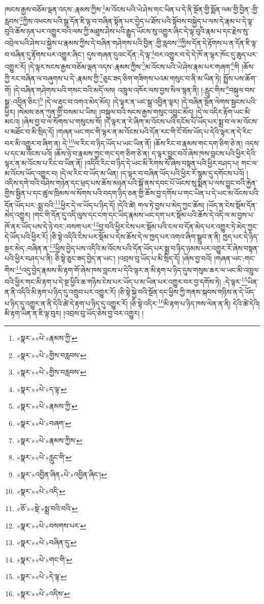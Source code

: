 །སངས་རྒྱས་བཅོམ་ལྡན་འདས་:རྣམས་ཀྱིས་\footnote{«སྣར་»«པེ་»རྣམས་ཀྱི་}མ་འོངས་པའི་ཡེ་ཤེས་གང་ཡིན་པ་དེ་ནི་སྔོན་གྱི་སྨོན་ལམ་གྱི་བྱིན་:གྱི་རླབས་\footnote{«སྣར་»«པེ་»གྱིས་བརླབས་}ཀྱིས་འཕངས་པའི་སྒྲ་དོན་ཇི་ལྟ་བ་བཞིན་སྟོན་པར་བྱེད་པ་ཐོས་པའི་སྟོབས་བསྐྱེད་པ་ལས་དེ་རྣམ་པ་དེ་ལྟ་བུའི་ཆོས་ཉན་པར་འགྱུར་བའི་ལས་ཀྱི་མཐུས་ཤེས་པའི་རྒྱུད་ཡོངས་སུ་འགྱུར་ཞིང་དེ་ལྟ་བུའི་རྣམ་པ་དང་རྗེས་སུ་འབྲེལ་པའི་ཤེས་པ་སྐྱེས་པ་རྣམས་ཀྱིས་དེ་བཞིན་གཤེགས་པའི་བྱིན་:གྱི་རླབས་\footnote{«སྣར་»«པེ་»གྱིས་བརླབས་}ཀྱིས་དོན་དེ་རྟོགས་པ་ན་དོན་ཇི་ལྟ་བ་བཞིན་དུ་རྟོགས་པར་འགྱུར་ཞིང་། དུས་གཞན་དུའང་དོན་:དེ་ལྟ་\footnote{«སྣར་»«པེ་»ད་ལྟ་}བར་འགྱུར་བ་དེ་དེ་ཁོ་ན་ལྟར་ཁོང་དུ་ཆུད་པར་འགྱུར་རོ། །དེ་ལྟར་སངས་རྒྱས་བཅོམ་ལྡན་འདས་:རྣམས་ཀྱིས་\footnote{«སྣར་»«པེ་»རྣམས་ཀྱི་}མ་འོངས་པའི་ཡེ་ཤེས་རྣམ་པར་གཞག་\footnote{«སྣར་»«པེ་»བཞག་}གི །ཆོས་ཀྱི་རང་བཞིན་ལ་བཞུགས་པ་དེ་:རྣམས་ཀྱི་\footnote{«སྣར་»«པེ་»རྣམས་ཀྱིས་}ཅུང་ཟད་ཅིག་གཟིགས་པའམ་གསུང་བ་ནི་མ་ཡིན་ཏེ། སྤྲོས་པས་ཆོག་གོ། །དེ་བཞིན་གཤེགས་པའི་གསང་བའི་མདོ་ལས། འཁྲུལ་འཁོར་ལས་བྱས་སིལ་སྙན་ནི། །:རླུང་གིས་\footnote{«སྣར་»«པེ་»རླུང་གི་}བསྐུལ་བས་སྒྲ་:འབྱིན་ཅིང་།\footnote{«སྣར་»འབྱིན་ཞིན«པེ་»འབྱིན་ཞིང་།} །དེ་ལ་རྡུང་བ་འགའ་མེད་མོད། །དེ་ལྟར་ན་ཡང་སྒྲ་འབྱིན་ལྟར། །དེ་བཞིན་སྔོན་ལེགས་སྦྱངས་པའི་ཕྱིར། །སེམས་ཅན་ཀུན་གྱི་བསམ་པ་ཡིས། །བསྐུལ་བའི་སངས་རྒྱས་གསུང་འབྱུང་མོད། །དེ་ལ་འདིར་རྟོག་ཡང་མི་མངའ། །ཞེས་བྱ་བ་ལ་སོགས་པ་གསུངས་སོ། །དེ་ལྟར་ན་རེ་ཞིག་མ་འོངས་པའི་དངོས་པོ་ཡོད་པར་སྨྲ་བ་ལ་མ་འོངས་པ་མཐོང་བ་མི་སྲིད་དོ། །གཞན་ཡང་གང་གི་ལྟར་ན་མ་འོངས་པའི་དོན་རང་གི་ངོ་བོས་ཡོད་པ་དེའི་ལྟར་ན་དེ་རིང་བར་མི་འགྱུར་བ་ཞིག་ན། དེ་\footnote{«སྣར་»«པེ་»འདི་}ལ་རིང་བ་ཉིད་ཡོད་པ་ཡང་ཡིན་ནོ། །ཆོས་རིང་བ་རྣམས་གང་དག་ཅིག་ཅེ་ན། འདས་པ་དང་མ་འོངས་པའོ། །ཆོས་ཉེ་བ་རྣམས་ཀྱང་གང་དག་ཅིག་ཅེ་ན། ད་ལྟར་བྱུང་བའོ་ཞེས་ཁས་བླངས་པའི་ཕྱིར་དེའི་ལྟར་ན་མ་འོངས་པ་རིང་བ་ཡིན་ནོ། །འདིའི་རིང་བ་ཉིད་དེ་ཡང་མི་རིགས་སོ་ཞེས་བསྟན་པའི་ཕྱིར་བཤད་པ། གང་ལ་མ་འོངས་ཡོད་འགྱུར་བ། །དེ་ལ་རིང་བ་ཡོད་མ་ཡིན། །ད་ལྟར་བ་བཞིན་ཡོད་པའི་ཕྱིར་རོ་སྙམ་དུ་དགོངས་པའོ། །འདིས་དགེ་བའི་བཤེས་གཉེན་དང་ཕྲད་པས་ཆོས་མཉན་པའི་སྒོ་ནས་དབང་པོ་ཡོངས་སུ་སྨིན་པ་ལས་བྱུང་བའི་རྐྱེན་གྱིས་སྦྱིན་པ་དང་ཚུལ་ཁྲིམས་ལ་སོགས་པའི་བདག་ཉིད་ཅན་གྱི་ཆོས་བྱ་དགོས་པ་གང་ཡིན་པ་དེ་ཡང་མ་འོངས་པའི་དོན་ཡོད་པར་:སྨྲ་བའི་\footnote{«ཅོ་»«སྡེ་»སྨྲ་བའི་བའི་}ཕྱིར་དེ་ལ་ཡོད་པ་ཉིད་དོ། །དེའི་ཚེ། གལ་ཏེ་བྱས་པ་མེད་ཀྱང་ཆོས། །ཡོད་ན་ངེས་སྡོམ་དོན་མེད་འགྱུར། །གང་གི་དོན་དུ་འདི་ལུས་དང་ངག་དང་ཡིད་རྣམས་ཡང་དག་པར་སྡོམ་པའི་ཆོས་དེ་འདི་ལ་མ་བྱས་པ་ཁོ་ནར་ཡོད་པས་དེ་ཉེ་བར་:བསག་པར་\footnote{«སྣར་»«པེ་»བསགས་པར་}བྱ་བའི་ཕྱིར་ངེས་པར་སྡོམ་པའི་ངལ་བ་དོན་མེད་པར་འགྱུར་ཏེ་མེད་ཀྱང་དེ་ཡོད་པའི་ཕྱིར་རོ། །ཅི་སྟེ་འདིའི་ངེས་པར་སྡོམ་པ་དེས་ཆོས་དེ་ལ་ཁྱད་པར་འགའ་ཞིག་སྒྲུབ་ན་ནི། ཁྱད་པར་དེ་ཉིད་སྔར་མེད་:བཞིན་ན་\footnote{«སྣར་»«པེ་»བཞིན་དུ་}ཕྱིས་བྱེད་པས་འདིའི་མ་འོངས་པའི་དོན་ཡོད་པར་སྨྲ་བ་ཉིད་ཉམས་པར་འགྱུར་རོ་ཞེས་བསྟན་པའི་ཕྱིར་བཤད་པ་ནི། ཅི་སྟེ་ཅུང་ཟད་བྱེད་ན་ཡང་། །འབྲས་བུ་ཡོད་པ་མི་སྲིད་དོ། །ཞེས་བྱ་བའོ། །གཞན་ཡང་:གང་གིས་\footnote{«སྣར་»«པེ་»གང་གི་}འདུ་བྱེད་རྣམས་མི་རྟག་གོ་ཞེས་ཁས་བླངས་པ་དེའི་ལྟར་ན་མི་རྟག་པ་ཉིད་དུས་གསུམ་ཆར་ལ་ཡང་མི་འཁྲུལ་བའི་ཕྱིར་གང་མི་རྟག་པ་དེ་སྔ་ཕྱིའི་ཆ་གཉིས་ངེས་པར་ཡོད་པ་མ་ཡིན་པར་འགྱུར་བར་བྱ་དགོས་ཏེ། :དེ་ལྟར་\footnote{«སྣར་»«པེ་»དེ་ལྟ་}ཡིན་ན་ནི་འདིའི་མི་རྟག་པ་ཉིད་དུ་འགྲུབ་པར་འགྱུར་རོ། །ཅི་སྟེ་སྐྱེ་བའི་སྔོན་དང་ཕྱིས་ཀྱི་གནས་སྐབས་གཉིས་ན་དེ་ཡོད་པ་ཉིད་དུ་འགྱུར་ན་ནི་དེའི་ཚེ་དེ་རྟག་པ་ཉིད་དུ་འགྱུར་རོ། །ཅི་སྟེ་འདིར་\footnote{«སྣར་»«པེ་»འདིས་}མི་རྟག་པ་ཉིད་ཁས་ལེན་ན་ནི། དེའི་ཚེ་དེའི། མི་རྟག་ཡིན་ན་ཇི་ལྟ་བུར། །འབྲས་བུ་ཡོད་ཅེས་བྱ་བར་འགྱུར། །
